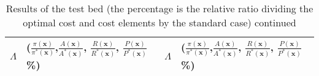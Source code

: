 \documentclass[preprint,12pt]{elsarticle}
\begin{document}
\begin{appendices}
\begin{table}[htbp]
\footnotesize
  \centering
  \caption{Results of the test bed (the percentage is the relative ratio dividing the optimal cost and cost elements by the standard case) continued}
    \begin{tabular}{llll}
    \toprule
        $\Lambda$ & ($\frac{\pi({\boldsymbol{x}})}{\pi^{*}({\boldsymbol{x}})}$,$\frac{A(\boldsymbol{x})}{A^{*}(\boldsymbol{x})}$,
    $\frac{R(\boldsymbol{x})}{R^{*}(\boldsymbol{x})}$, $\frac{P(\boldsymbol{x})}{P^{*}(\boldsymbol{x})}$ \%)    & $\Lambda$ & ($\frac{\pi({\boldsymbol{x}})}{\pi^{*}({\boldsymbol{x}})}$,$\frac{A(\boldsymbol{x})}{A^{*}(\boldsymbol{x})}$,
    $\frac{R(\boldsymbol{x})}{R^{*}(\boldsymbol{x})}$, $\frac{P(\boldsymbol{x})}{P^{*}(\boldsymbol{x})}$ \%) \\
   \midrule


\end{tabular}
\end{table}
\end{appendices}
\end{document}
